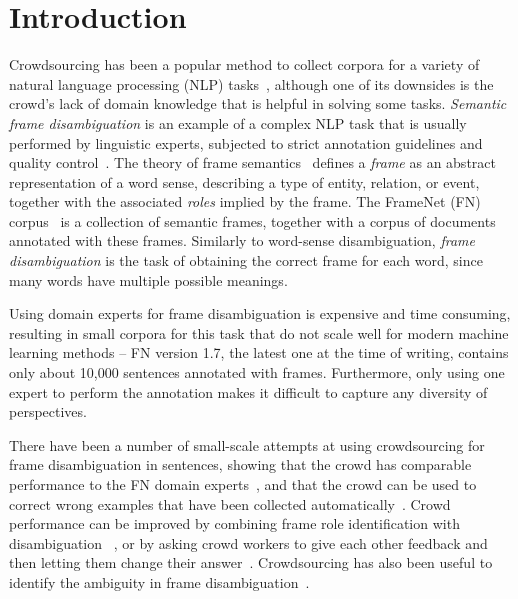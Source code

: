 \section{Introduction}

Crowdsourcing has been a popular method to collect corpora for a variety of natural language processing (NLP) tasks~\cite{Snow:2008}, although one of its downsides is the crowd's lack of domain knowledge that is helpful in solving some tasks. \textit{Semantic frame disambiguation} is an example of a complex NLP task that is usually performed by linguistic experts, subjected to strict annotation guidelines and quality control~\cite{baker2012framenet}. The theory of frame semantics~\cite{Fillmore:1982} defines a \textit{frame} as an abstract representation of a word sense, describing a type of entity, relation, or event, together with the associated \emph{roles} implied by the frame. The FrameNet (FN) corpus~\cite{baker1998berkeley} is a collection of semantic frames, together with a corpus of documents annotated with these frames. Similarly to word-sense disambiguation, \textit{frame disambiguation} is the task of obtaining the correct frame for each word, since many words have multiple possible meanings.

Using domain experts for frame disambiguation is expensive and time consuming, resulting in small corpora for this task that do not scale well for modern machine learning methods -- FN version 1.7, the latest one at the time of writing, contains only about 10,000 sentences annotated with frames. Furthermore, only using one expert to perform the annotation makes it difficult to capture any diversity of perspectives.  

There have been a number of small-scale attempts at using crowdsourcing for frame disambiguation in sentences, showing that the crowd has comparable performance to the FN domain experts~\cite{Hong:2011:GCR:2018966.2018970}, and that the crowd can be used to correct wrong examples that have been collected automatically~\cite{pavlick2015framenet+}. Crowd performance can be improved by combining frame role identification with disambiguation ~\cite{fossati2013outsourcing}, or by asking crowd workers to give each other feedback and then letting them change their answer~\cite{chang2015scaling}. Crowdsourcing has also been useful to identify the ambiguity in frame disambiguation~\cite{jurgens2013embracing}.  

